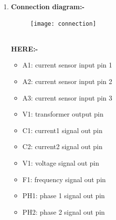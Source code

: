 \documentclass[a4paper,12pt,oneside]{book}
\begin{document}
\begin{enumerate}
	\newpage
  \item \textbf{Connection diagram:-}
  \begin{figure}[h]
  	\texttt{[image: connection]}
  \end{figure}
  \\\textbf{HERE:-} 
   \begin{itemize}
   	\item A1:  current sensor input pin 1
   	\item A2:  current sensor input pin 2
   	\item A3:  current sensor input pin 3
   	\item V1:  transformer output pin
   	\item C1:  current1 signal out pin 
   	\item C2:  current2 signal out pin
   	\item V1:  voltage signal out pin
   	\item F1:  frequency signal out pin
   	\item PH1:  phase 1 signal out pin
   	\item PH2:  phase 2 signal out pin
   \end{itemize}
\end{enumerate}

\newpage
\end{document}
